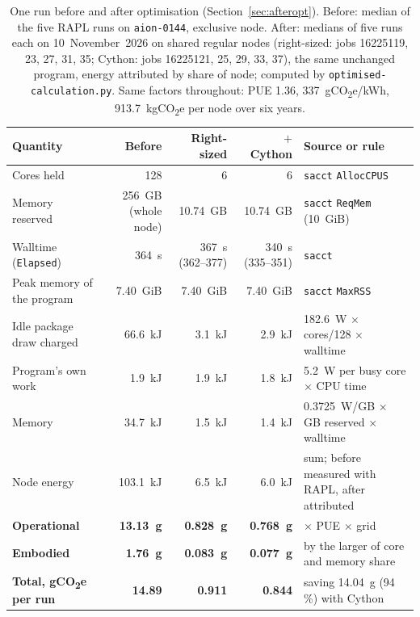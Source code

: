 \documentclass[conference,a4paper]{IEEEtran}
\begin{document}
\begin{table}[!t]
\caption{One run before and after optimisation (Section~\ref{sec:afteropt}).
Before: median of the five RAPL runs on \texttt{aion-0144}, exclusive node.
After: medians of five runs each on 10~November~2026 on shared regular nodes
(right-sized: jobs 16225119, 23, 27, 31, 35; Cython: jobs 16225121, 25, 29, 33, 37), the same
unchanged program, energy attributed by share of node; computed by
\texttt{optimised-calculation.py}. Same factors throughout: PUE 1.36,
337~gCO\textsubscript{2}e/kWh, 913.7~kgCO\textsubscript{2}e per node over six
years.}
\label{tab:afteropt}
\centering\footnotesize\setlength{\tabcolsep}{4pt}
\begin{tabular}{@{}lrrrl@{}}
\toprule
Quantity & Before & Right-sized & $+$ Cython & Source or rule \\
\midrule
Cores held & 128 & 6 & 6 & \texttt{sacct} \texttt{AllocCPUS} \\
Memory reserved & 256~GB (whole node) & 10.74~GB & 10.74~GB & \texttt{sacct} \texttt{ReqMem} (10~GiB) \\
Walltime (\texttt{Elapsed}) & 364~s & 367~s (362--377) & 340~s (335--351) & \texttt{sacct} \\
Peak memory of the program & 7.40~GiB & 7.40~GiB & 7.40~GiB & \texttt{sacct} \texttt{MaxRSS} \\
Idle package draw charged & 66.6~kJ & 3.1~kJ & 2.9~kJ & 182.6~W $\times$ cores/128 $\times$ walltime \\
Program's own work & 1.9~kJ & 1.9~kJ & 1.8~kJ & 5.2~W per busy core $\times$ CPU time \\
Memory & 34.7~kJ & 1.5~kJ & 1.4~kJ & 0.3725~W/GB $\times$ GB reserved $\times$ walltime \\
Node energy & 103.1~kJ & 6.5~kJ & 6.0~kJ & sum; before measured with RAPL, after attributed \\
\textbf{Operational} & \textbf{13.13~g} & \textbf{0.828~g} & \textbf{0.768~g} & $\times$ PUE $\times$ grid \\
\textbf{Embodied} & \textbf{1.76~g} & \textbf{0.083~g} & \textbf{0.077~g} & by the larger of core and memory share \\
\textbf{Total, gCO\textsubscript{2}e per run} & \textbf{14.89} & \textbf{0.911} & \textbf{0.844} & saving 14.04~g (94\,\%) with Cython \\
\bottomrule
\end{tabular}
\end{table}
\end{document}
